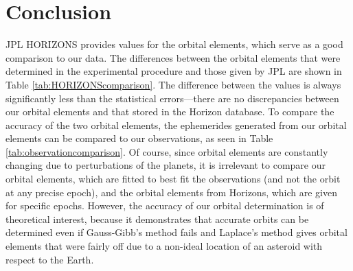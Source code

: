 \documentclass[12pt,journal,compsoc]{IEEEtran}
\begin{document}
\begin{table}[!t]
\centering
{}
\caption{Comparison of JPL HORIZONS ephemerides and ephemerides from determined orbital elements with observation data\label{tab:observationcomparison}}
\end{table}

\section{Conclusion}
JPL HORIZONS provides values for the orbital elements, which serve as a good comparison to our data.
The differences between the orbital elements that were determined in the experimental procedure and those given by JPL are shown in Table \ref{tab:HORIZONScomparison}.
The difference between the values is always significantly less than the statistical errors---there are no discrepancies between
our orbital elements and that stored in the Horizon database.
To compare the accuracy of the two orbital elements, the ephemerides generated from our orbital elements can be compared to our observations, as seen in Table \ref{tab:observationcomparison}.
Of course, since orbital elements are constantly changing due to perturbations of the planets,
it is irrelevant to compare our orbital elements, which are fitted to best fit the observations (and not the orbit at any
precise epoch), and the 
orbital elements from Horizons, which are given for specific epochs.
However, the accuracy of our orbital determination is of theoretical interest, because 
it demonstrates that accurate orbits can be determined even if Gauss-Gibb's method fails and Laplace's method
gives orbital elements that were fairly off due to a non-ideal location of an asteroid with respect to the Earth.

\end{document}
